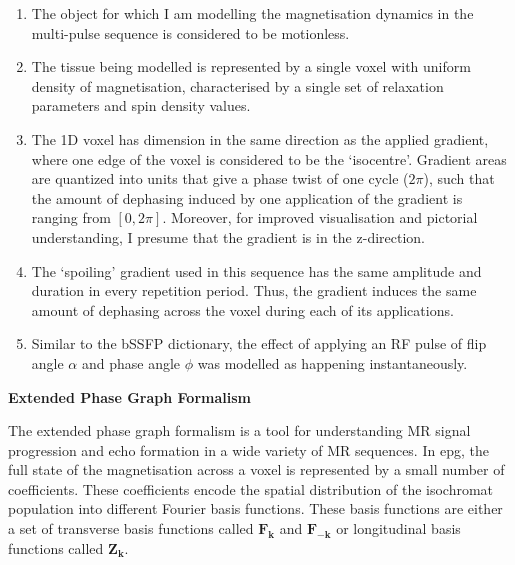 \begin{enumerate}

    \item The object for which I am modelling the magnetisation dynamics in the multi-pulse sequence is considered to be motionless.

    \item The tissue being modelled is represented by a single voxel with uniform density of magnetisation, characterised by a single set of relaxation parameters and spin density values.
    
    \item The 1D voxel has dimension in the same direction as the applied gradient, where one edge of the voxel is considered to be the `isocentre'.
    Gradient areas are quantized into units that give a phase twist of one cycle ($2\pi$), such that the amount of dephasing induced by one application of the gradient is ranging from $[0, 2\pi]$. 
    Moreover, for improved visualisation and pictorial understanding, I presume that the gradient is in the z-direction.

    \item The `spoiling' gradient used in this sequence has the same amplitude and duration in every repetition period.
    Thus, the gradient induces the same amount of dephasing across the voxel during each of its applications.
    
    \item Similar to the bSSFP dictionary, the effect of applying an RF pulse of flip angle $\alpha$ and phase angle $\phi$ was modelled as happening instantaneously.

\end{enumerate}

\hfill

\large \textbf{Extended Phase Graph Formalism} \normalsize

The extended phase graph formalism is a tool for understanding MR signal progression and echo formation in a wide variety of MR sequences.
In \ac{epg}, the full state of the magnetisation across a voxel is represented by a small number of coefficients.
These coefficients encode the spatial distribution of the isochromat population into different Fourier basis functions.
These basis functions are either a set of transverse basis functions called $\bm{F_k}$ and $\bm{F_{-k}}$ or longitudinal basis functions called $\bm{Z_k}$.

